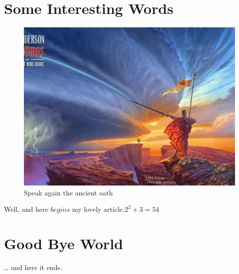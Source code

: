 \documentclass[a4paper,11pt]{article}
\author{Theo.h}\title
\begin{document}
\maketitle
\tableofcontents
\section{Some Interesting Words}
\begin{figure}[htbp]
\centerline{\includegraphics[scale=.2]{way-kings-stormlight-archive-brandon-sanderson-cover.jpg}}
\caption{Speak again the ancient oath}
\label{fig}
\end{figure}
Well, and here $begins$ my lovely article.$2^2+3=54$
\section{Good Bye World}
\ldots{} and here it ends.
\end{document}
